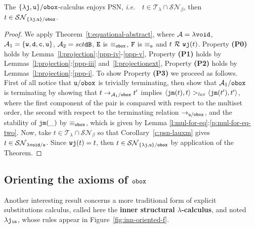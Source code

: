 \documentclass{LMCS}
\newcommand{\ie}{{\it  i.e.}~}
\renewcommand{\>}{\rightarrow}
\def\lam{\lambda}
\newcommand{\Rew}[1]{\rightarrow_{#1}}
\newcommand{\SN}[1]{\mathcal{SN}_{#1}}
\newcommand{\calA}{\mathcal{A}}
\newcommand{\B}{{\tt dB}}
\newcommand{\ttE}{{\tt E}}
\newcommand{\ttF}{{\tt F}}
\newcommand{\R}{\mathcal{R}}
\newcommand{\dis}{{\tt j}}
\newcommand{\ldis}{\lam{\dis}}
\newcommand{\pair}[2]{\langle #1, #2 \rangle}
\newcommand{\proj}{\wfc}
\newcommand{\Var}{{\tt d}}
\newcommand{\DSubs}{{\tt c}}
\newcommand{\iinn}{{\tt in}}
\newcommand{\ldisin}{\lam \dis_{\iinn}}
\newcommand{\Gc}{{\tt w}}
\newcommand{\set}[1]{ \{ #1 \}}
\newcommand{\terms}{\mathcal{T}}
\newcommand{\termslambda}{\terms_{\lam}}
\newcommand{\dm}[1]{\dis {\tt m}(#1)}
\newcommand{\deft}[1]{{\bf #1}}
\newcommand{\wfc}{\Gc\dis}
\newcommand{\unboxed}{{\tt u}}
\newcommand{\modulo}[2]{#1/#2}
\newcommand{\eqw}[1]{\equiv_{#1}}
\newcommand{\osym}{{\tt o}}
\newcommand{\fsymb}{\osymb\boite}
\newcommand{\osymb}{{\tt o}}
\newcommand{\eqf}{\eqw{\fsymb}}
\newcommand{\aux}{{\tt void}}
\newcommand{\laux}{\lam\aux}
\newcommand{\lauxm}{\lam\modulo{ \aux }{ \osymb }}
\newcommand{\boite}{{\tt box}}
\begin{document}
\begin{thm}
\label{t:psn-enriched}
The $\modulo{\set{\ldis,
      \unboxed}}{\fsymb}$-calculus enjoys PSN, \ie\ $t \in
\termslambda \cap \SN{\beta}$, then $t \in 
\SN{\modulo{\set{\ldis,\unboxed}}{\fsymb}}$.
\end{thm}

\begin{proof}
We apply Theorem~\ref{t:equational-abstract}, where $\calA = \laux$,
$\calA_1= \set{\Gc, \Var,\DSubs,\unboxed}$, $\calA_2=\\set{\B}$,
$\ttE$ is $\equiv_{\fsymb}$, $\ttF$ is $\equiv_{\osym}$ and
$t\ \R\ \proj(t)$. Property {\bf (P0)} holds by
Lemma~\ref{l:projection}:\ref{ppp-iv}-\ref{ppp-v}, Property {\bf (P1)}
holds by Lemmas~\ref{l:projection}:\ref{ppp-iii}
and~\ref{l:projectionext}, Property {\bf (P2)} holds by
Lemmas~\ref{l:projection}:\ref{ppp-i}. To show Property {\bf (P3)} we
proceed as follows. First of all notice that
$\modulo{\unboxed}{\fsymb}$ is trivially terminating, then show that
$\modulo{\calA_1}{\fsymb}$ is terminating by showing that $t
\Rew{\modulo{\calA_1}{\fsymb}} t'$ implies $\pair{\dm{t}}{t} >_{lex}
\pair{\dm{t'}}{t'}$, where the first component of the pair is compared
with respect to the multiset order, the second with respect to the
terminating relation $\Rew{\modulo{\unboxed}{\fsymb}}$, and the
stability of $\dm{\_}$ by $\eqf$, which is given by Lemma
\ref{l:mul-for-eq}:\ref{p:mul-for-eq-two}.  Now, take $t \in
  \termslambda \cap \SN{\beta}$ so that Corollary~\ref{c:psn-lauxm}
  gives $t \in \SN{\lauxm}$. Since $\proj(t) = t$, then $t \in
  \SN{\modulo{\set{\ldis, \unboxed}}{\fsymb}}$ by application of the
  Theorem. 
\end{proof}


\subsection{Orienting the axioms of $\fsymb$}

Another interesting result concerns a more
traditional form of explicit substitutions calculus, called here the 
\deft{inner structural $\lam$-calculus},  and noted $\ldisin$,  whose rules appear in Figure~\ref{fig:inn-oriented-f}.
\end{document}
